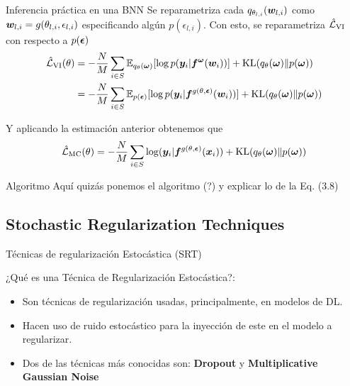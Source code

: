 \begin{frame}{Inferencia práctica en una BNN}
    Se reparametriza cada $q_{\theta_{l, i}}({\bm{w}}_{l, i})$ como ${\bm{w}}_{l, i} = g(\theta_{l, i}, \epsilon_{l, i})$ especificando algún $p(\epsilon_{l, i})$. Con esto, se reparametriza $\hat{\mathcal{L}}_{\operatorname{VI}}$ con respecto a $p({\bm{\epsilon}})$
    \begin{align*}
        \hat{\mathcal{L}}_{\operatorname{VI}}(\theta) &= -\frac{N}{M} \sum_{i \in S} \mathbb{E}_{q_\theta({\bm{\omega}})} [\log p({\bm{y}}_i | {\bm{f}}^{\bm{\omega}}({\bm{w}}_i))] + \operatorname{KL}(q_\theta({\bm{\omega}}) \| p({\bm{\omega}}))\\
        &= -\frac{N}{M} \sum_{i \in S} \mathbb{E}_{p({\bm{\epsilon}})} [\log p({\bm{y}}_i | {\bm{f}}^{g(\theta, {\bm{\epsilon}})}({\bm{w}}_i))] + \operatorname{KL}(q_\theta({\bm{\omega}}) \| p({\bm{\omega}}))
    \end{align*}
    
    Y aplicando la estimación anterior obtenemos que
    \begin{equation}\label{Lmc}
        \hat{\mathcal{L}}_{\operatorname{MC}}(\theta) = -\frac{N}{M} \sum_{i \in S} \log({\bm{y}}_i | {\bm{f}}^{g(\theta, {\bm{\epsilon}})}({\bm{x}}_i)) + \operatorname{KL}(q_\theta({\bm{\omega}}) \| p({\bm{\omega}}))
    \end{equation}
\end{frame}

\begin{frame}{Algoritmo}
    Aquí quizás ponemos el algoritmo (?) y explicar lo de la Eq. (3.8)
\end{frame}

\subsection{Stochastic Regularization Techniques}

\begin{frame}{Técnicas de regularización Estocástica (SRT)}

¿Qué es una Técnica de Regularización Estocástica?:

\begin{itemize}
    \item Son técnicas de regularización usadas, principalmente, en modelos de DL.
    \item Hacen uso de ruido estocástico para la inyección de este en el modelo a regularizar.
    \item Dos de las técnicas más conocidas son: \textbf {Dropout} y \textbf{Multiplicative Gaussian Noise}
\end{itemize}

\end{frame}

